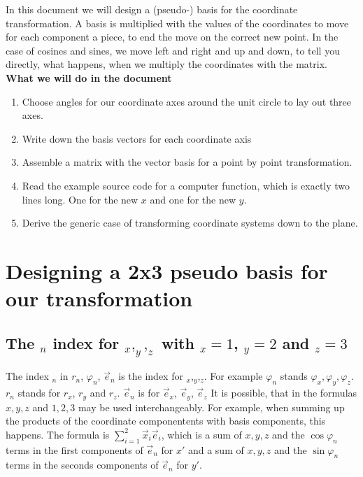 \documentclass[a4paper]{article}
\begin{document}
In this document we will design a (pseudo-) basis for the coordinate transformation. 
A basis is multiplied with the values of the coordinates to move for each component 
a piece, to end the move on the correct new point.
In the case of cosines and sines, we move left and right and up and down, to 
tell you directly, what happens, when we multiply the coordinates with the matrix.\\

\textbf{What we will do in the document}

\begin{enumerate}
\item Choose angles for our coordinate axes around the unit circle to lay out three axes.
\item Write down the basis vectors for each coordinate axis
\item Assemble a matrix with the vector basis for a point by point transformation.
\item Read the example source code for a computer function, which is exactly two lines long. One for the new $x$ and one for the new $y$.
\item Derive the generic case of transforming coordinate systems down to the plane.
\end{enumerate}

\section{Designing a 2x3 pseudo basis for our transformation}

\subsection{The $_n$ index for $_x,_y,_z$ with $_x=1$, $_y=2$ and $_z=3$}

The index $_n$ in $r_n$, $\varphi_n$, $\vec{e}_n$ is the index for $_x$,$_y$,$_z$. For example $\varphi_n$  stands $\varphi_x, \varphi_y, \varphi_z$. $r_n$ stands for $r_x$, $r_y$ and $r_z$. $\vec{e}_n$ is for $\vec{e}_x$, $\vec{e}_y$, $\vec{e}_z$ It is possible, that in the formulas $x,y,z$ and $1,2,3$ may be used interchangeably. For example, when summing up the products of the coordinate componentents with basis components, this happens. The formula is $\sum_{i=1}^{2}\vec{x}_i\vec{e}_i$, which is a sum of $x,y,z$ and the $\cos \varphi_n$ terms in the first components of $\vec{e}_n$ for $x'$ and a sum of $x,y,z$ and the $\sin \varphi_n$ terms in the seconds components of $\vec{e}_n$ for $y'$.
\end{document}
